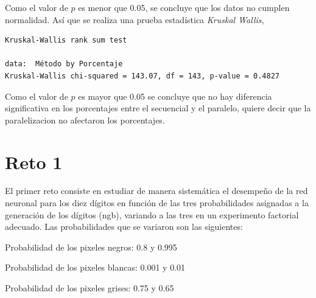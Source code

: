 \documentclass[10pt,a4paper]{article}
\begin{document}
Como el valor de $p$ es menor que 0.05, se concluye que los datos no cumplen normalidad. Así que se realiza una prueba estadística \emph{Kruskal Wallis}, 
\begin{lstlisting}
Kruskal-Wallis rank sum test

data:  Método by Porcentaje
Kruskal-Wallis chi-squared = 143.07, df = 143, p-value = 0.4827
\end{lstlisting}
\vspace{0.5cm}

Como el valor de $p$ es mayor que 0.05 se concluye que no hay diferencia significativa en los porcentajes entre el secuencial y el paralelo, quiere decir que la paralelizacion no afectaron los porcentajes. 
\newpage
\section*{Reto 1}
El primer reto consiste en estudiar de manera sistemática el desempeño de la red neuronal para los diez dígitos en función de las tres probabilidades asignadas a la generación de los dígitos (ngb), variando a las tres en un experimento factorial adecuado.
Las probabilidades que se variaron son las siguientes:
\begin{itemize}
Probabilidad de los pixeles negros: 0.8 y 0.995
\end{itemize}
\begin{itemize}
Probabilidad de los pixeles blancas: 0.001 y 0.01
\end{itemize}
\begin{itemize}
Probabilidad de los pixeles grises: 0.75 y 0.65
\end{itemize}
\vspace{0.5cm}
\end{document}
